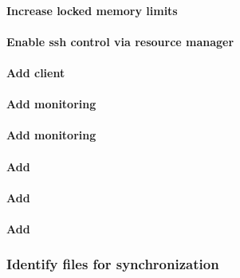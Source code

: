 \documentclass[letterpaper]{article}
\begin{document}
\paragraph{Increase locked memory limits}


\paragraph{Enable ssh control via resource manager} 


\paragraph{Add \Lustre{} client} \label{sec:lustre_client}




\paragraph{Add \Nagios{} monitoring}


\vspace*{0.4cm}
\paragraph{Add \Ganglia{} monitoring}


%

\paragraph{Add \mrsh{}}


\paragraph{Add \genders{}}


\paragraph{Add \conman{}} \label{sec:add_conman}


\subsubsection{Identify files for synchronization} \label{sec:file_import}



\end{document}

